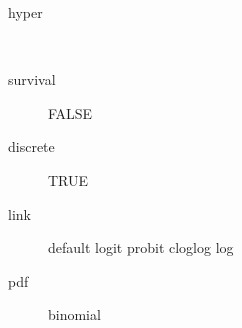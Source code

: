 \begin{description}
	\item[hyper]\ 
	\item[survival] FALSE
	\item[discrete] TRUE
	\item[link] default logit probit cloglog log
	\item[pdf] binomial
\end{description}
